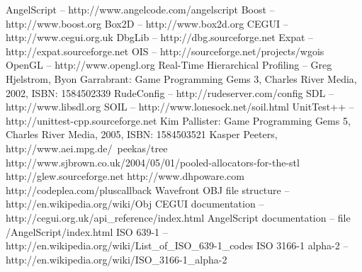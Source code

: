 \documentclass[a4paper, 12pt]{report}
\begin{document}
\begin{thebibliography}{9}
AngelScript -- http://www.angelcode.com/angelscript
Boost -- http://www.boost.org
Box2D -- http://www.box2d.org
CEGUI -- http://www.cegui.org.uk
DbgLib -- http://dbg.sourceforge.net
Expat -- http://expat.sourceforge.net
OIS -- http://sourceforge.net/projects/wgois
OpenGL -- http://www.opengl.org
Real-Time Hierarchical Profiling -- Greg Hjelstrom, Byon Garrabrant: Game Programming Gems 3, Charles River Media, 2002, ISBN: 1584502339
RudeConfig -- http://rudeserver.com/config
SDL -- http://www.libsdl.org
SOIL -- http://www.lonesock.net/soil.html
UnitTest++ -- http://unittest-cpp.sourceforge.net
Kim Pallister: Game Programming Gems 5, Charles River Media, 2005, ISBN: 1584503521
Kasper Peeters, http://www.aei.mpg.de/~peekas/tree
http://www.sjbrown.co.uk/2004/05/01/pooled-allocators-for-the-stl
http://glew.sourceforge.net
http://www.dhpoware.com
http://codeplea.com/pluscallback
Wavefront OBJ file structure -- http://en.wikipedia.org/wiki/Obj
CEGUI documentation -- http://cegui.org.uk/api\_reference/index.html
AngelScript documentation -- file /AngelScript/index.html
ISO 639-1 -- http://en.wikipedia.org/wiki/List\_of\_ISO\_639-1\_codes
ISO 3166-1 alpha-2 -- http://en.wikipedia.org/wiki/ISO\_3166-1\_alpha-2
\end{thebibliography}

\clearpage
\listoffigures
{}

\clearpage
\listoftables
{}
\end{document}

